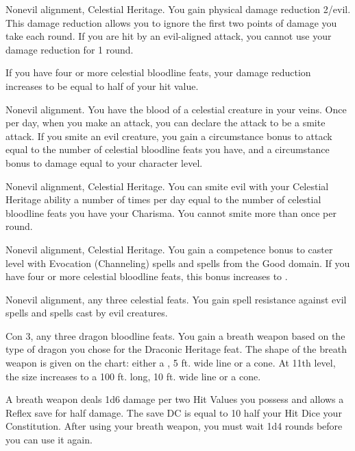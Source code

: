 Nonevil alignment, Celestial Heritage.
 You gain physical damage reduction 2/evil. This damage reduction allows you to ignore the first two points of damage you take each round. If you are hit by an evil-aligned attack, you cannot use your damage reduction for 1 round.

If you have four or more celestial bloodline feats, your damage reduction increases to be equal to half of your hit value.

 Nonevil alignment.
 You have the blood of a celestial creature in your veins. Once per day, when you make an attack, you can declare the attack to be a smite attack. If you smite an evil creature, you gain a circumstance bonus to attack equal to the number of celestial bloodline feats you have, and a circumstance bonus to damage equal to your character level.

 Nonevil alignment, Celestial Heritage.
 You can smite evil with your Celestial Heritage ability a number of times per day equal to the number of celestial bloodline feats you have \add your Charisma. You cannot smite more than once per round.

 Nonevil alignment, Celestial Heritage.
 You gain a  competence bonus to caster level with Evocation (Channeling) spells and spells from the Good domain. If you have four or more celestial bloodline feats, this bonus increases to .

 Nonevil alignment, any three celestial feats.
 You gain spell resistance against evil spells and spells cast by evil creatures.

 Con 3, any three dragon bloodline feats.
 You gain a breath weapon based on the type of dragon you chose for the Draconic Heritage feat. The shape of the breath weapon is given on the  chart: either a \arealarge, 5 ft. wide line or a \areamed cone. At 11th level, the size increases to a 100 ft. long, 10 ft. wide line or a \arealarge cone.

A breath weapon deals 1d6 damage per two Hit Values you possess and allows a Reflex save for half damage. The save DC is equal to 10 \add half your Hit Dice \add your Constitution. After using your breath weapon, you must wait 1d4 rounds before you can use it again.

